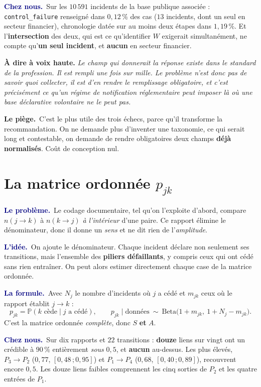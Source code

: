 \documentclass[11pt,a4paper]{article}
\providecommand{\Prob}{\mathbb{P}}
\newcommand{\lequoi}[1]{\smallskip\noindent\textcolor{navy}{\textbf{Le problème.}}\ #1\par}
\newcommand{\lidee}[1]{\smallskip\noindent\textcolor{navy}{\textbf{L'idée.}}\ #1\par}
\newcommand{\laformule}[1]{\smallskip\noindent\textcolor{navy}{\textbf{La formule.}}\ #1\par}
\newcommand{\cheznous}[1]{\smallskip\noindent\textcolor{navy}{\textbf{Chez nous.}}\ #1\par}
\newcommand{\lepiege}[1]{\smallskip\noindent\textcolor{accent}{\textbf{Le piège.}}\ #1\par}
\newcommand{\laphrase}[1]{\begin{phrasebox}\textbf{À dire à voix haute.} \emph{#1}\end{phrasebox}}
\begin{document}
\cheznous{Sur les $10\,591$ incidents de la base publique associée : \texttt{control\_failure}
renseigné dans \textbf{$0{,}12\,\%$} des cas ($13$ incidents, dont un seul en secteur
financier), chronologie datée sur au moins deux étapes dans \textbf{$1{,}19\,\%$}. Et
l'\textbf{intersection} des deux, qui est ce qu'identifier $W$ exigerait simultanément, ne
compte qu'\textbf{un seul incident}, et \textbf{aucun} en secteur financier.}

\laphrase{Le champ qui donnerait la réponse existe dans le standard de la profession. Il est
rempli une fois sur mille. Le problème n'est donc pas de savoir quoi collecter, il est d'en
rendre le remplissage obligatoire, et c'est précisément ce qu'un régime de notification
réglementaire peut imposer là où une base déclarative volontaire ne le peut pas.}

\lepiege{C'est le plus utile des trois échecs, parce qu'il transforme la recommandation. On ne
demande plus d'inventer une taxonomie, ce qui serait long et contestable, on demande de rendre
obligatoires deux champs \textbf{déjà normalisés}. Coût de conception nul.}

\section{La matrice ordonnée $p_{jk}$}

\lequoi{Le codage documentaire, tel qu'on l'exploite d'abord, compare $n(j\to k)$ à
$n(k\to j)$ \emph{à l'intérieur} d'une paire. Ce rapport élimine le dénominateur, donc il
donne un \emph{sens} et ne dit rien de l'\emph{amplitude}.}

\lidee{On ajoute le dénominateur. Chaque incident déclare non seulement ses transitions, mais
l'ensemble des \textbf{piliers défaillants}, y compris ceux qui ont cédé sans rien entraîner.
On peut alors estimer directement chaque case de la matrice ordonnée.}

\laformule{Avec $N_j$ le nombre d'incidents où $j$ a cédé et $m_{jk}$ ceux où le rapport
établit $j\to k$ :
\[
  p_{jk}=\Prob(k \text{ cède}\mid j \text{ a cédé}),
  \qquad
  p_{jk}\mid\text{données}\ \sim\ \mathrm{Beta}\bigl(1+m_{jk},\ 1+N_j-m_{jk}\bigr).
\]
C'est la matrice ordonnée \emph{complète}, donc $S$ \textbf{et} $A$.}

\cheznous{Sur dix rapports et $22$ transitions : \textbf{douze} liens sur vingt ont un crédible
à $90\,\%$ entièrement \emph{sous} $0{,}5$, et \textbf{aucun} au-dessus. Les plus élevés,
$P_3\to P_2$ ($0{,}77$, $[0{,}48\,;0{,}95]$) et $P_1\to P_4$ ($0{,}68$, $[0{,}40\,;0{,}89]$),
recouvrent encore $0{,}5$. Les douze liens faibles comprennent les cinq sorties de $P_2$ et les
quatre entrées de $P_1$.}
\end{document}
